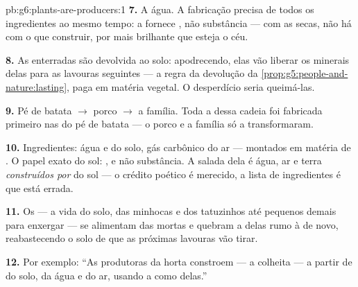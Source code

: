 \begin{solution}{pb:g6:plants-are-producers:1}
\textbf{7.} A água. A fabricação precisa de todos os ingredientes ao
mesmo tempo: a  fornece , não substância --- com as 
secas, não há com o que construir, por mais brilhante que esteja o céu.

\textbf{8.} As  enterradas são  devolvida ao
solo: apodrecendo, elas vão liberar os minerais delas para as
lavouras seguintes --- a regra da devolução da
\cref{prop:g5:people-and-nature:lasting}, paga em matéria vegetal. O
desperdício seria queimá-las.

\textbf{9.} Pé de batata $\rightarrow$ porco $\rightarrow$ a família.
Toda a  dessa cadeia foi fabricada primeiro nas
 do pé de batata --- o porco e a família só a transformaram.

\textbf{10.} Ingredientes: água e  do solo, gás
carbônico do ar --- montados em matéria de . O papel exato do
sol: , e não substância. A salada dela é água, ar e terra
\emph{construídos por}  do sol --- o crédito poético é merecido, a
lista de ingredientes é que está errada.

\textbf{11.} Os  --- a vida do solo, das minhocas e dos
tatuzinhos até  pequenos demais para enxergar --- se
alimentam das  mortas e quebram a  delas rumo à
 de novo, reabastecendo o solo de que as próximas
lavouras vão tirar.

\textbf{12.} Por exemplo: ``As produtoras da horta constroem  --- a colheita --- a partir de  do solo, da
água e do ar, usando a  como  delas.''
\end{solution}
